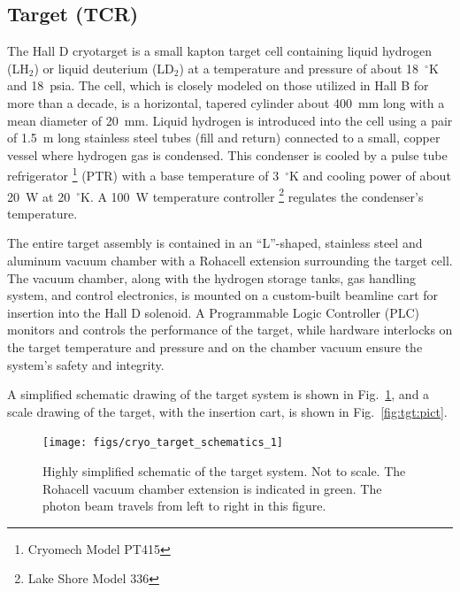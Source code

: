 \subsection[Target (TCR)]{Target \label{sec:target} (TCR)}
The Hall D cryotarget is a small kapton target cell containing liquid
hydrogen (LH$_2$) or liquid deuterium (LD$_2$) at a temperature and pressure
of about 18~$^\circ$K and 18~psia. The cell, which is closely modeled on those
utilized in Hall B for more than a decade, is a horizontal, tapered
cylinder about 400~mm long with a mean diameter of 20~mm.  Liquid
hydrogen is introduced into the cell using a pair of 1.5~m long
stainless steel tubes (fill and return) connected to a small, copper
vessel where hydrogen gas is condensed.  This condenser is cooled by a
pulse tube refrigerator%
\footnote{Cryomech Model PT415}
(PTR) with a base temperature of 3~$^\circ$K and
cooling power of about 20~W at 20~$^\circ$K.  
A 100~W temperature controller%
\footnote{Lake Shore Model 336}
regulates the condenser's temperature.

The entire target assembly is contained in an ``L''-shaped,
stainless steel and aluminum vacuum chamber with a Rohacell extension
surrounding the target cell.  The vacuum chamber, along with the
hydrogen storage tanks, gas handling system, and control electronics,
is mounted on a custom-built beamline cart for insertion into the Hall
D solenoid.  A Programmable Logic Controller (PLC) monitors and
controls the performance of the target, while hardware interlocks on
the target temperature and pressure and on the chamber vacuum ensure
the system's safety and integrity.

A simplified schematic drawing of the target system is shown in 
Fig.~\ref{fig:tgt:scheme}, and a scale drawing of the target, 
with the insertion cart, is shown in Fig.~\ref{fig:tgt:pict}.


\begin{figure}[h]
\begin{center}
    \texttt{[image: figs/cryo\_target\_schematics\_1]}
\end{center}
\caption{
Highly simplified schematic of the target system.  Not to scale.  The
Rohacell vacuum chamber extension is indicated in green.  The photon
beam travels from left to right in this figure.
\label{fig:tgt:scheme}}
\end{figure}



